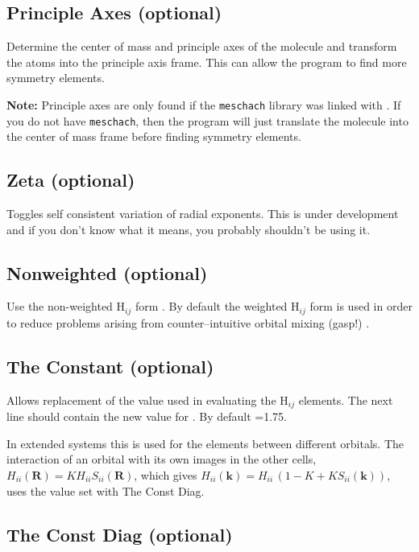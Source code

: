 \subsection{{\sf Principle Axes} (optional)}

Determine the center of mass and principle axes of the molecule and
transform the atoms into the principle axis frame.  This can allow the
program to find more symmetry elements.  

{\bf Note:} Principle axes are only found if the {\tt meschach} library
was linked with \calcprog.  If you do not have {\tt meschach}, then
the program will just translate the molecule into the center of mass
frame before finding symmetry elements.

\subsection{{\sf Zeta} (optional)}

Toggles self consistent variation of radial exponents.  This is under
development and if you don't know what it means, you probably
shouldn't be using it.

\subsection{{\sf Nonweighted} (optional)}

Use the non-weighted H$_{ij}$ form \cite{wolfsberg}. 
By default the weighted H$_{ij}$
form is used in order to reduce problems arising from
counter--intuitive orbital mixing (gasp!) \cite{com1,com2}.

\subsection{{\sf The Constant} (optional)}

Allows replacement of the value  used in evaluating the H$_{ij}$
elements.  The next line should contain the new value for .
By default =1.75.

In extended systems this  is used for the elements between
different orbitals. The interaction of an orbital with its own images
in the other cells, $H_{ii}(\mathbf{R}) = K H_{ii} S_{ii}(\mathbf{R})$,
which gives $H_{ii}(\mathbf{k}) = H_{ii}\,(1 - K + K S_{ii}(\mathbf{k}))$,
uses the value set with {\sf The Const Diag}.

\subsection{{\sf The Const Diag} (optional)}

